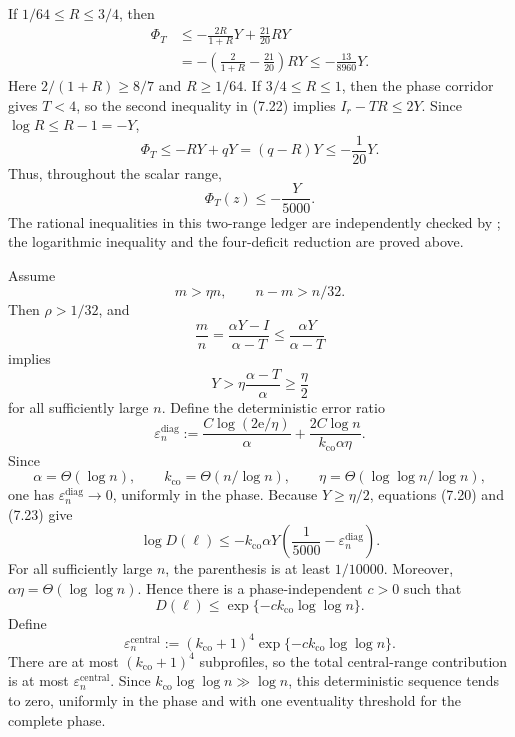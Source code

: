 If $1/64\le R\le3/4$, then
\[
\begin{aligned}
 \Phi_T
 &\le-\frac{2R}{1+R}Y+\frac{21}{20}RY\\
 &=-\left(\frac{2}{1+R}-\frac{21}{20}\right)RY
 \le-\frac{13}{8960}Y.
\end{aligned}
\]
Here $2/(1+R)\ge8/7$ and $R\ge1/64$. If $3/4\le R\le1$, then the phase
corridor gives $T<4$, so the second inequality in (7.22) implies
$I_r-TR\le2Y$. Since $\log R\le R-1=-Y$,
\[
  \Phi_T\le-RY+qY=(q-R)Y\le-\frac1{20}Y.
\]
Thus, throughout the scalar range,
\begin{equation*}
  \Phi_T(z)\le-\frac{Y}{5000}.
  \tag{7.23}
\end{equation*}
The rational inequalities in this two-range ledger are independently checked
by ; the logarithmic inequality and the
four-deficit reduction are proved above.

Assume
\begin{equation*}
  m>\eta n,
  \qquad
  n-m>n/32.
  \tag{7.24}
\end{equation*}
Then $\rho>1/32$, and
\[
  \frac mn=\frac{\alpha Y-I}{\alpha-T}
  \le\frac{\alpha Y}{\alpha-T}
\]
implies
\[
  Y>\eta\frac{\alpha-T}{\alpha}\ge\frac\eta2
\]
for all sufficiently large $n$. Define the deterministic error ratio
\begin{equation*}
  \varepsilon_n^{\mathrm{diag}}
  :=
  \frac{C\log(2\mathrm e/\eta)}{\alpha}
  +
  \frac{2C\log n}{k_{\mathrm{co}}\alpha\eta}.
  \tag{7.24a}
\end{equation*}
Since
\[
  \alpha=\Theta(\log n),
  \qquad
  k_{\mathrm{co}}=\Theta(n/\log n),
  \qquad
  \eta=\Theta(\log\log n/\log n),
\]
one has $\varepsilon_n^{\mathrm{diag}}\to0$, uniformly in the phase. Because
$Y\ge\eta/2$, equations (7.20) and (7.23) give
\[
  \log D(\ell)
  \le
  -k_{\mathrm{co}}\alpha Y
   \left(\frac1{5000}-\varepsilon_n^{\mathrm{diag}}\right).
\]
For all sufficiently large $n$, the parenthesis is at least $1/10000$.
Moreover, $\alpha\eta=\Theta(\log\log n)$. Hence there is a phase-independent
$c>0$ such that
\begin{equation*}
  D(\ell)
  \le
  \exp\{-c k_{\mathrm{co}}\log\log n\}.
  \tag{7.25}
\end{equation*}
Define
\[
  \varepsilon_n^{\mathrm{central}}
  :=
  (k_{\mathrm{co}}+1)^4
  \exp\{-c k_{\mathrm{co}}\log\log n\}.
\]
There are at most $(k_{\mathrm{co}}+1)^4$ subprofiles, so the total
central-range contribution is at most
$\varepsilon_n^{\mathrm{central}}$. Since
$k_{\mathrm{co}}\log\log n\gg\log n$, this deterministic sequence tends to
zero, uniformly in the phase and with one eventuality threshold for the
complete phase.
